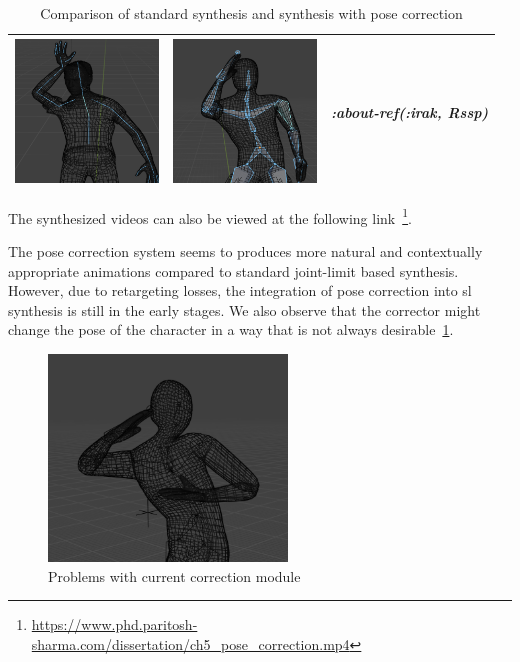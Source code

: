 \documentclass[../../main.tex]{subfiles}
\begin{document}
\begin{table}
\begin{tabular}{|c|c|c|}
    \includegraphics[width = 1.5in]{chapters/intermediate_blocks_pose_correction/images/standard_synthesis_abt_ref_irak.png} & \includegraphics[width = 1.5in]{chapters/intermediate_blocks_pose_correction/images/pose_correction_synthesis_abt_ref_irak.png} &
      \emph{:about-ref(:irak, Rssp)} \\
    \hline
  \end{tabular}
  \caption{Comparison of standard synthesis and synthesis with pose correction}
  \label{tab:results}
\end{table}

The synthesized videos can also be viewed at the following link~\footnote{\url{https://www.phd.paritosh-sharma.com/dissertation/ch5_pose_correction.mp4}}.

The pose correction system seems to produces more natural and contextually appropriate animations compared to standard joint-limit based synthesis. However, due to retargeting losses, the integration of pose correction into \gls{sl} synthesis is still in the early stages. We also observe that the corrector might change the pose of the character in a way that is not always desirable~\ref{fig:problem_pose_correction}.

\begin{figure}
  \centering \includegraphics[width = 2.5in]{chapters/intermediate_blocks_pose_correction/images/problem_pose_correction.png}
  \caption{Problems with current correction module}
  \label{fig:problem_pose_correction}
\end{figure}
\end{document}
